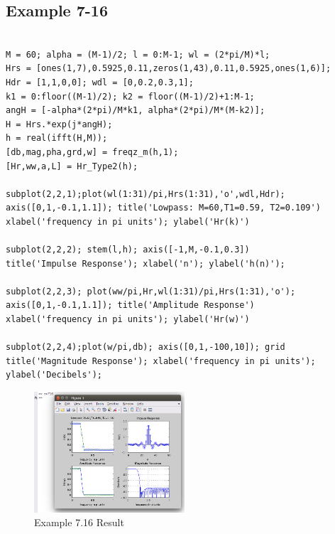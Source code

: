 \documentclass[11pt
  , a4paper
  , article
  , oneside
]{memoir}
\begin{document}
\subsection{Example 7-16}
\begin{lstlisting}[style=termstyle]
% Example 7.16

M = 60; alpha = (M-1)/2; l = 0:M-1; wl = (2*pi/M)*l;
Hrs = [ones(1,7),0.5925,0.11,zeros(1,43),0.11,0.5925,ones(1,6)];
Hdr = [1,1,0,0]; wdl = [0,0.2,0.3,1];
k1 = 0:floor((M-1)/2); k2 = floor((M-1)/2)+1:M-1;
angH = [-alpha*(2*pi)/M*k1, alpha*(2*pi)/M*(M-k2)];
H = Hrs.*exp(j*angH);
h = real(ifft(H,M));
[db,mag,pha,grd,w] = freqz_m(h,1);
[Hr,ww,a,L] = Hr_Type2(h);

subplot(2,2,1);plot(wl(1:31)/pi,Hrs(1:31),'o',wdl,Hdr); 
axis([0,1,-0.1,1.1]); title('Lowpass: M=60,T1=0.59, T2=0.109')
xlabel('frequency in pi units'); ylabel('Hr(k)')

subplot(2,2,2); stem(l,h); axis([-1,M,-0.1,0.3])
title('Impulse Response'); xlabel('n'); ylabel('h(n)');

subplot(2,2,3); plot(ww/pi,Hr,wl(1:31)/pi,Hrs(1:31),'o');
axis([0,1,-0.1,1.1]); title('Amplitude Response')
xlabel('frequency in pi units'); ylabel('Hr(w)')

subplot(2,2,4);plot(w/pi,db); axis([0,1,-100,10]); grid
title('Magnitude Response'); xlabel('frequency in pi units');
ylabel('Decibels');

\end{lstlisting}

\begin{figure}[h!]
	\centering
	\includegraphics[width=0.5\textwidth,height=0.4\textwidth]{./images/ex716.png}
	\caption{Example 7.16 Result}
	\label{fig:Example 7.16 Result}
\end{figure}


\clearpage
\end{document}
